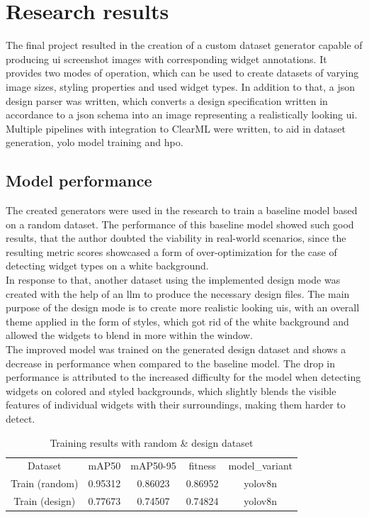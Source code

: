 \documentclass[Bachelor, BIC, english, fhCitStyle, IEEE]{BASE/twbook} %
\begin{document}
\chapter{Research results}
The final project resulted in the creation of a custom dataset generator capable of producing \ac{ui} screenshot images with corresponding widget annotations. It provides two modes of operation, which can be used to create datasets of varying image sizes, styling properties and used widget types.
In addition to that, a \ac{json} design parser was written, which converts a design specification written in accordance to a \ac{json} schema into an image representing a realistically looking \ac{ui}. Multiple pipelines with integration to ClearML were written, to aid in dataset generation, \ac{yolo} model training and \acf{hpo}.
\section{Model performance}
The created generators were used in the research to train a baseline model based on a random dataset. The performance of this baseline model showed such good results, that the author doubted the viability in real-world scenarios, since the resulting metric scores showcased a form of over-optimization for the case of detecting widget types on a white background.\\
In response to that, another dataset using the implemented design mode was created with the help of an \ac{llm} to produce the necessary design files. The main purpose of the design mode is to create more realistic looking \acp{ui}, with an overall theme applied in the form of styles, which got rid of the white background and allowed the widgets to blend in more within the window.\\
The improved model was trained on the generated design dataset and shows a decrease in performance when compared to the baseline model. The drop in performance is attributed to the increased difficulty for the model when detecting widgets on colored and styled backgrounds, which slightly blends the visible features of individual widgets with their surroundings, making them harder to detect.\\
\begin{table}[]
    \centering
    \begin{tabular}{c|c|c|c|c}
         Dataset & mAP50 & mAP50-95 & fitness & model\_variant \\
         Train (random) & 0.95312 & 0.86023 & 0.86952 & yolov8n \\
         Train (design) & 0.77673 & 0.74507 & 0.74824 & yolov8n
    \end{tabular}
    \caption{Training results with random \& design dataset}
    \label{tab:overall-training-results}
\end{table}\\
\end{document}

